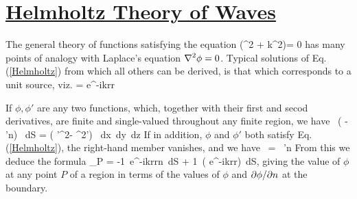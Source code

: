 \section{\underline{Helmholtz Theory of Waves}}

The general theory of functions satisfying the equation 
\be (\nabla^2 + k^2)\phi = 0 \label{Helmholtz}\ee
has many points of analogy with Laplace's equation $\displaystyle \nabla^2\phi = 0$. 
Typical solutions of  Eq.(\ref{Helmholtz}) from which all others can be derived, is that which corresponds to a unit source, viz.
\be \phi = {e^{-ikr}\pi r} \ee

If $\phi, \phi'$ are any two functions, which, together with their first and secod derivatives, are finite and single-valued throughout any finite region, we have
\be \int\int\, \left(  - \phi'{\partial\phi\over\partial n}\right) \, dS = \int\int\int \left( \phi'\nabla^2\phi - \phi\nabla^2\phi'\right) \, dx\, dy\, dz \ee
If in addition, $\phi$ and $\phi'$ both satisfy Eq.(\ref{Helmholtz}), the right-hand member vanishes, and we have
\be \int\int\,  = \int\int\,  \phi'{\partial\phi\over\partial n} \ee
From this we deduce the formula
\be \phi_P = -{1\pi}\int\int\, {e^{-ikr}\over r}{\partial\phi\over\partial n}\, dS + {1\pi}\int\int \,  \left( {e^{-ikr}\over r}\right)\, dS, \ee
giving the value of $\phi$ at any point $P$ of a region in terms of the values of $\phi$ and $\displaystyle \partial\phi/\partial n$ at the boundary.

